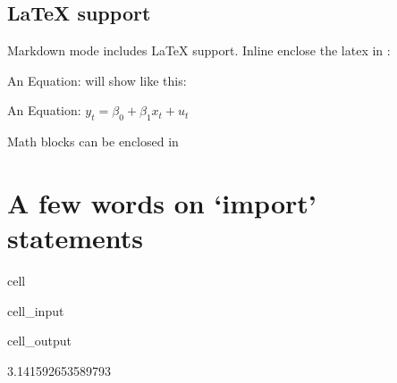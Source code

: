 \documentclass[letterpaper,10pt,english]{jupyterBook}
\begin{document}
\subsection{LaTeX support}
\label{\detokenize{content/Python/Intro_Jupyter_notebook:latex-support}}
\sphinxAtStartPar
Markdown mode includes LaTeX support.
Inline enclose the latex in \sphinxcode{\sphinxupquote{\$}}:

\sphinxAtStartPar
An Equation:  will show like this:

\sphinxAtStartPar
An Equation: \(y_t = \beta_0 + \beta_1 x_t + u_t\)

\sphinxAtStartPar
Math blocks can be enclosed in \sphinxcode{\sphinxupquote{\$\$}}


\section{A few words on ‘import’ statements}
\label{\detokenize{content/Python/Intro_Jupyter_notebook:a-few-words-on-import-statements}}
\begin{sphinxuseclass}{cell}\begin{sphinxVerbatimInput}

\begin{sphinxuseclass}{cell_input}
\begin{sphinxVerbatim}[commandchars=\\\{\}]
 
\end{sphinxVerbatim}

\end{sphinxuseclass}\end{sphinxVerbatimInput}
\begin{sphinxVerbatimOutput}

\begin{sphinxuseclass}{cell_output}
\begin{sphinxVerbatim}[commandchars=\\\{\}]
3.141592653589793
\end{sphinxVerbatim}

\end{sphinxuseclass}\end{sphinxVerbatimOutput}

\end{sphinxuseclass}
\end{document}
